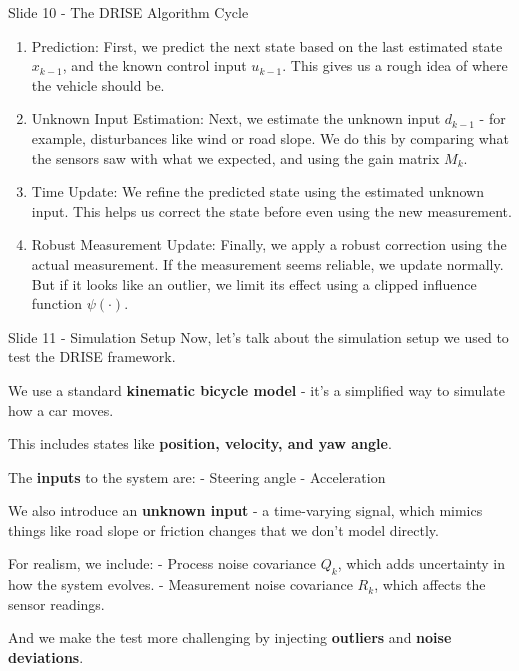 \documentclass{beamer}
\begin{document}
\begin{frame}{Slide 10 - The DRISE Algorithm Cycle}
\protect\hypertarget{slide-10---the-drise-algorithm-cycle}{}
\begin{enumerate}
\item Prediction: First, we predict the next state based on the last estimated state \(x_{k-1}\), and the known control input \(u_{k-1}\). This gives us a rough idea of where the vehicle should be.
\item Unknown Input Estimation: Next, we estimate the unknown input \(d_{k-1}\) - for example, disturbances like wind or road slope. We do this by comparing what the sensors saw with what we expected, and using the gain matrix \(M_k\).
\item Time Update: We refine the predicted state using the estimated unknown input. This helps us correct the state before even using the new measurement.
\item Robust Measurement Update: Finally, we apply a robust correction using the actual measurement. If the measurement seems reliable, we update normally. But if it looks like an outlier, we limit its effect using a clipped influence function \(\psi(\cdot)\).
\end{enumerate}
\end{frame}

\begin{frame}{Slide 11 - Simulation Setup}
\protect\hypertarget{slide-11---simulation-setup}{}
Now, let's talk about the simulation setup we used to test the DRISE
framework.

We use a standard \textbf{kinematic bicycle model} - it's a simplified
way to simulate how a car moves.

This includes states like \textbf{position, velocity, and yaw angle}.

The \textbf{inputs} to the system are: - Steering angle - Acceleration

We also introduce an \textbf{unknown input} - a time-varying signal,
which mimics things like road slope or friction changes that we don't
model directly.

For realism, we include: - Process noise covariance \(Q_k\), which adds
uncertainty in how the system evolves. - Measurement noise covariance
\(R_k\), which affects the sensor readings.

And we make the test more challenging by injecting \textbf{outliers} and
\textbf{noise deviations}.
\end{frame}
\end{document}
